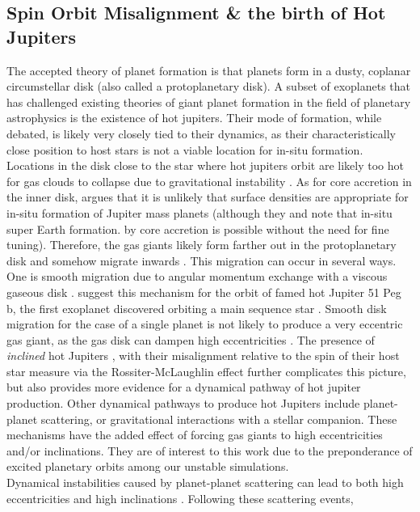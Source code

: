 \documentclass{aastex631}
\begin{document}
\subsection{Spin Orbit Misalignment \& the birth of Hot Jupiters}
The accepted theory of planet formation is that planets form in a dusty, coplanar circumstellar disk (also called a protoplanetary
disk). A subset of exoplanets that has challenged existing theories of giant planet formation in the field of planetary astrophysics is the 
existence of hot jupiters. Their mode of formation, while debated, is likely very closely tied to their dynamics, 
as their characteristically close position to host stars is not a viable location for in-situ formation. Locations in the disk close to the star
where hot jupiters orbit are likely too hot for gas clouds to collapse due to gravitational instability \citep{raf05}. As for core accretion in the inner disk,
\cite{lee16} argues that it is unlikely that surface densities are appropriate for in-situ formation of Jupiter mass planets (although they 
and \cite{chi13} note that in-situ super Earth formation.
by core accretion is possible without the need for fine tuning). Therefore, 
the gas giants likely form farther out in the protoplanetary disk and somehow migrate inwards \citep{lee16}.  This migration can occur in several ways. One is 
smooth migration due to angular momentum exchange with a viscous gaseous disk \citep{gol80}. \cite{lin96} suggest 
this mechanism for the orbit of famed hot Jupiter 51 Peg b, the first exoplanet discovered orbiting 
a main sequence star \cite{may95}. Smooth disk migration for the case of a single planet is not likely to produce a very eccentric gas giant, as the gas 
disk can dampen high eccentricities \citep{duf15}. 
The presence of \textit{inclined} hot Jupiters \citep{alb12}, with their misalignment relative to the spin
of their host star measure via the Rossiter-McLaughlin effect \citep{ros24} further complicates this picture, but also provides more evidence for a dynamical pathway 
of hot jupiter production. 
Other dynamical pathways to produce hot Jupiters include planet-planet scattering, or gravitational interactions with a stellar companion. These mechanisms
have the added effect of forcing gas giants to high eccentricities and/or inclinations. They are of interest to this work due to the preponderance of 
excited planetary orbits among our unstable simulations.\\
\indent Dynamical instabilities caused by planet-planet scattering can lead to both high eccentricities and high inclinations \citep{bea12}. Following these scattering events,
\end{document}
